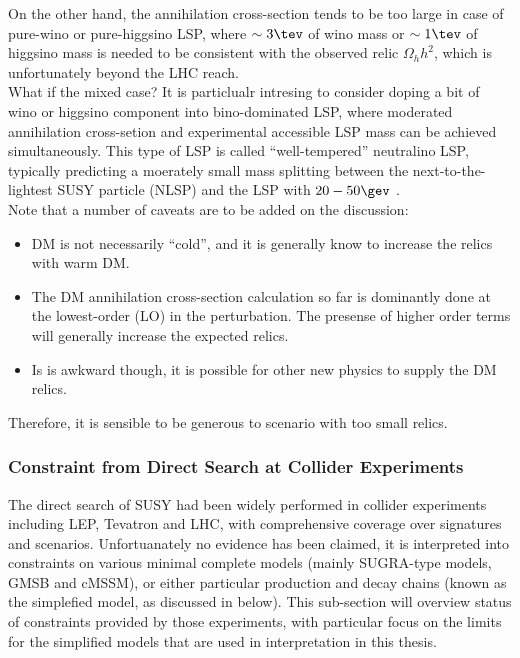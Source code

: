 On the other hand, 
the annihilation cross-section tends to be too large in case of pure-wino or pure-higgsino LSP, where $\sim 3\tev$ of wino mass or $\sim 1\tev$ of higgsino mass is needed to be consistent with the observed relic $\Omega_h h^2$, which is unfortunately beyond the LHC reach. \\

What if the mixed case? It is particlualr intresing to consider doping a bit of wino or higgsino component into bino-dominated LSP, where moderated annihilation cross-setion and experimental accessible LSP mass can be achieved simultaneously. This type of LSP is called ``well-tempered'' neutralino LSP, typically predicting a moerately small mass splitting between the next-to-the-lightest SUSY particle (NLSP) and the LSP with $20-50\gev$ \cite{WTN_calcdM}. \\

Note that a number of caveats are to be added on the discussion:
\begin{itemize}
\item DM is not necessarily ``cold'', and it is generally know to increase the relics with warm DM. \\
\item The DM annihilation cross-section calculation so far is dominantly done at the lowest-order (LO) in the perturbation. 
The presense of higher order terms will generally increase the expected relics. 
\item Is is awkward though, it is possible for other new physics to supply the DM relics.
\end{itemize}
Therefore, it is sensible to be generous to scenario with too small relics.

			
\subsubsection{Constraint from Direct Search at Collider Experiments} 
The direct search of SUSY had been widely performed in collider experiments including LEP, Tevatron and LHC, with comprehensive coverage over signatures and scenarios. Unfortuanately no evidence has been claimed, it is interpreted into constraints on various minimal complete models (mainly SUGRA-type models, GMSB and cMSSM), or either particular production and decay chains (known as the simplefied model, as discussed in below).
This sub-section will overview status of constraints provided by those experiments,
with particular focus on the limits for the simplified models 
that are used in interpretation in this thesis. \\

